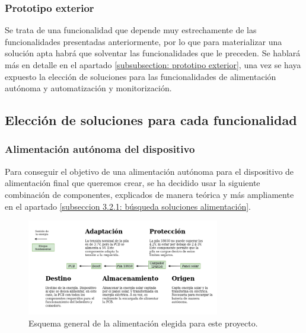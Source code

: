 \documentclass[12pt]{article}
\begin{document}
	
	\subsubsection{Prototipo exterior}
	
	\noindent Se trata de una funcionalidad que depende muy estrechamente de las funcionalidades presentadas anteriormente, por lo que para materializar una solución apta habrá que solventar las funcionalidades que le preceden. Se hablará más en detalle en el apartado \ref{subsubsection: prototipo exterior}, una vez se haya expuesto la elección de soluciones para las funcionalidades de alimentación autónoma y automatización y monitorización.
	\pagebreak
	
	\subsection[Elección soluciones]{Elección de soluciones para cada funcionalidad}
	\label{Subsección 3.3: elección de soluciones para cada funcionalidad}
	
	\subsubsection{Alimentación autónoma del dispositivo}
	
	\noindent Para conseguir el objetivo de una alimentación autónoma para el dispositivo de alimentación final que queremos crear, se ha decidido usar la siguiente combinación de componentes, explicados de manera teórica y más ampliamente en el apartado \ref{subseccion 3.2.1: búsqueda soluciones alimentación}.
	
	\begin{figure}[h!]
		\begin{center}
			\includegraphics[width=0.75\textwidth]{img/conexiones tfg-alimentacion.png}
			\caption{Esquema general de la alimentación elegida para este proyecto.}
			\label{Alimentación: esquema general}
		\end{center}
	\end{figure}
	
\end{document}
